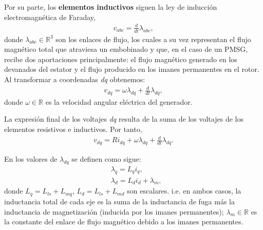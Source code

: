 Por su parte, los \textbf{elementos inductivos} siguen la ley de inducción electromagnética de Faraday,
\begin{align}
    v_{abc} = \frac{d}{dt}\lambda_{abc},
\end{align}
donde $\lambda_{abc} \in \mathbb{R}^3$ son los enlaces de flujo, los cuales a su vez representan el 
flujo magnético total que atraviesa un embobinado y que, en el caso de un PMSG, recibe dos aportaciones principalmente:
el flujo magnético generado en los devanados del estator y el flujo producido en los imanes permanentes en el rotor.
Al transformar a coordenadas \emph{dq} obtenemos:
\begin{align}
    v_{dq} = \omega\lambda_{dq} + \frac{d}{dt}\lambda_{dq},
\end{align}
donde $\omega \in \mathbb{R}$ es la velocidad angular eléctrica del generador.

La expresión final de los voltajes \emph{dq} resulta de la suma de los voltajes de los elementos resistivos e inductivos. 
Por tanto,
\begin{align}
    v_{dq} = Ri_{dq} + \omega\lambda_{dq} + \frac{d}{dt}\lambda_{dq}.
\end{align}

En \cite{krause2013} los valores de $\lambda_{dq}$ se definen como sigue: 
\begin{align}
    &\lambda_q = L_q i_q,
    \\ 
    &\lambda_d = L_d i_d + \lambda_m,
\end{align}
donde $L_q = L_{ls} + L_{mq}$, $L_d = L_{ls} + L_{md}$ son escalares. i.e. en ambos casos, la inductancia 
total de cada eje es la suma de la inductancia de fuga más la inductancia de magnetización 
(inducida por los imanes permanentes); $\lambda_m \in \mathbb{R}$ es la constante 
del enlace de flujo magnético debido a los imanes permanentes.
\\



